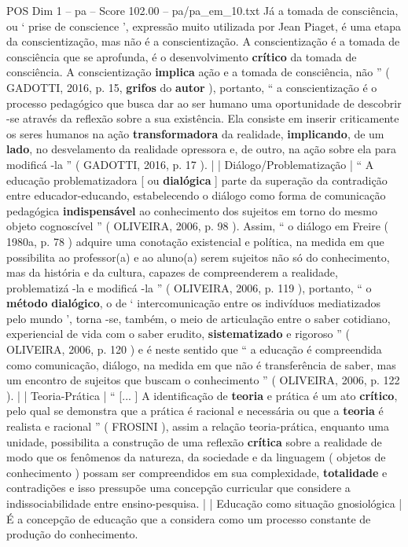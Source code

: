 \begin{textsample}{POS Dim 1 – pa – Score 102.00 – pa/pa\_em\_10.txt}
Já a tomada de consciência, ou ‘ prise de conscience ’, expressão muito utilizada por Jean Piaget, é uma etapa da conscientização, mas não é a conscientização.
A conscientização é a tomada de consciência que se aprofunda, é o desenvolvimento \textbf{crítico} da tomada de consciência.
A conscientização \textbf{implica} ação e a tomada de consciência, não ” ( GADOTTI, 2016, p. 15, \textbf{grifos} do \textbf{autor} ), portanto, “ a conscientização é o processo pedagógico que busca dar ao ser humano uma oportunidade de descobrir -se através da reflexão sobre a sua existência.
Ela consiste em inserir criticamente os seres humanos na ação \textbf{transformadora} da realidade, \textbf{implicando}, de um \textbf{lado}, no desvelamento da realidade opressora e, de outro, na ação sobre ela para modificá -la ” ( GADOTTI, 2016, p. 17 ). | | Diálogo/Problematização | “ A educação problematizadora [ ou \textbf{dialógica} ] parte da superação da contradição entre educador-educando, estabelecendo o diálogo como forma de comunicação pedagógica \textbf{indispensável} ao conhecimento dos sujeitos em torno do mesmo objeto cognoscível ” ( OLIVEIRA, 2006, p. 98 ).
Assim, “ o diálogo em Freire ( 1980a, p. 78 ) adquire uma conotação existencial e política, na medida em que possibilita ao professor(a) e ao aluno(a) serem sujeitos não só do conhecimento, mas da história e da cultura, capazes de compreenderem a realidade, problematizá -la e modificá -la ” ( OLIVEIRA, 2006, p. 119 ), portanto, “ o \textbf{método} \textbf{dialógico}, o de ‘ intercomunicação entre os indivíduos mediatizados pelo mundo ’, torna -se, também, o meio de articulação entre o saber cotidiano, experiencial de vida com o saber erudito, \textbf{sistematizado} e rigoroso ” ( OLIVEIRA, 2006, p. 120 ) e é neste sentido que “ a educação é compreendida como comunicação, diálogo, na medida em que não é transferência de saber, mas um encontro de sujeitos que buscam o conhecimento ” ( OLIVEIRA, 2006, p. 122 ). | | Teoria-Prática | “ [... ] A identificação de \textbf{teoria} e prática é um ato \textbf{crítico}, pelo qual se demonstra que a prática é racional e necessária ou que a \textbf{teoria} é realista e racional ” ( FROSINI ), assim a relação teoria-prática, enquanto uma unidade, possibilita a construção de uma reflexão \textbf{crítica} sobre a realidade de modo que os fenômenos da natureza, da sociedade e da linguagem ( objetos de conhecimento ) possam ser compreendidos em sua complexidade, \textbf{totalidade} e contradições e isso pressupõe uma concepção curricular que considere a indissociabilidade entre ensino-pesquisa. | | Educação como situação gnosiológica | É a concepção de educação que a considera como um processo constante de produção do conhecimento.

\end{textsample}
